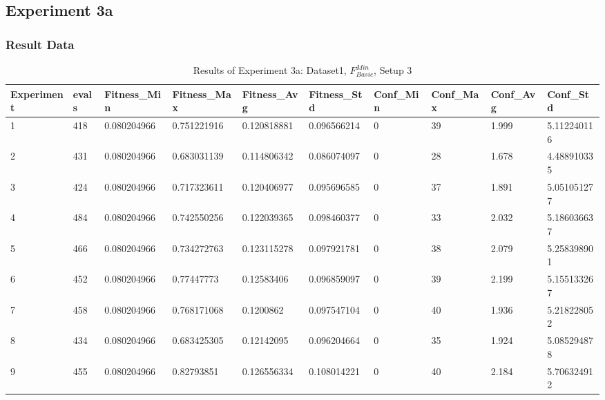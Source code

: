 	\subsection{Experiment 3a}
	\label{sec:A_Exp3a}
		\subsubsection{Result Data}
		\label{sec:A_Exp3a_Data}
		\begin{table}[H]
			\caption{Results of Experiment 3a: Dataset1, $F_{Basic}^{Min}$, Setup 3}
			\label{tab:A_Exp3a_Data}
			\begin{adjustbox}{max width=360pt,keepaspectratio,angle=90}
				\begin{tabular}{|l|l|l|l|l|l|l|l|l|l|}
					\hline
					\rowcolor[HTML]{EFEFEF} 
					Experiment & evals & Fitness\_Min & Fitness\_Max & Fitness\_Avg & Fitness\_Std & Conf\_Min & Conf\_Max & Conf\_Avg & Conf\_Std   \\ \hline
					1          & 418   & 0.080204966  & 0.751221916  & 0.120818881  & 0.096566214  & 0         & 39        & 1.999     & 5.112240116 \\ \hline
					2          & 431   & 0.080204966  & 0.683031139  & 0.114806342  & 0.086074097  & 0         & 28        & 1.678     & 4.488910335 \\ \hline
					3          & 424   & 0.080204966  & 0.717323611  & 0.120406977  & 0.095696585  & 0         & 37        & 1.891     & 5.051051277 \\ \hline
					4          & 484   & 0.080204966  & 0.742550256  & 0.122039365  & 0.098460377  & 0         & 33        & 2.032     & 5.186036637 \\ \hline
					5          & 466   & 0.080204966  & 0.734272763  & 0.123115278  & 0.097921781  & 0         & 38        & 2.079     & 5.258398901 \\ \hline
					6          & 452   & 0.080204966  & 0.77447773   & 0.12583406   & 0.096859097  & 0         & 39        & 2.199     & 5.155133267 \\ \hline
					7          & 458   & 0.080204966  & 0.768171068  & 0.1200862    & 0.097547104  & 0         & 40        & 1.936     & 5.218228052 \\ \hline
					8          & 434   & 0.080204966  & 0.683425305  & 0.12142095   & 0.096204664  & 0         & 35        & 1.924     & 5.085294878 \\ \hline
					9          & 455   & 0.080204966  & 0.82793851   & 0.126556334  & 0.108014221  & 0         & 40        & 2.184     & 5.706324912 \\ \hline

\end{tabular}
\end{adjustbox}
\end{table}
